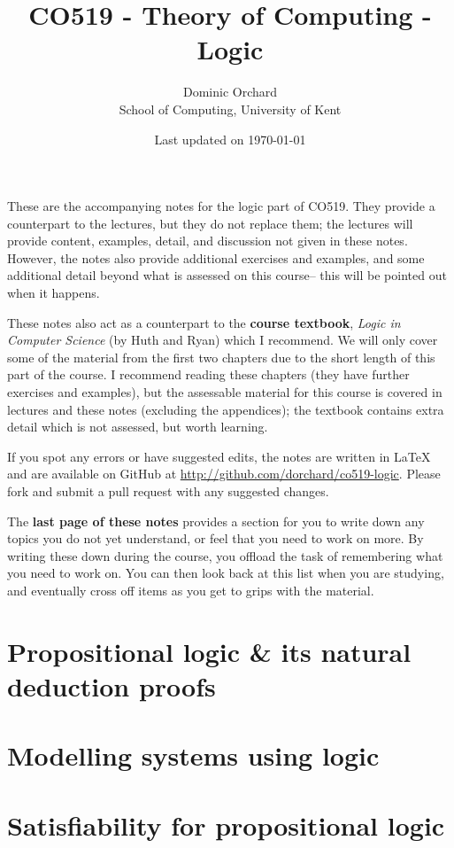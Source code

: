 \documentclass[a4paper]{article}
\title{\vspace{-3em}CO519 - Theory of Computing - Logic}
\author{Dominic Orchard \\
  {\small{School of Computing, University of Kent}}}
\date{Last updated on \today}
\theoremstyle{definition}
\begin{document}
\maketitle

\noindent
These are the accompanying notes for the logic part of CO519. They
provide a counterpart to the lectures, but they do not replace them; the
lectures will provide content, examples, detail, and discussion not given in
these notes.  However, the notes also provide additional exercises and
examples, and some additional detail beyond what is assessed on this
course-- this will be pointed out when it happens.

These notes also act as a counterpart to the \textbf{course textbook},
\emph{Logic in Computer Science} (by Huth and Ryan) which I
recommend. We will only cover some of the material from the first two
chapters due to the short length of this part of the course. I
recommend reading these chapters (they have further exercises and
examples), but the assessable material for this course is covered in
lectures and these notes (excluding the appendices); the textbook
contains extra detail which is not assessed, but worth learning.

If you spot any errors or have suggested edits, the notes are written
in LaTeX and are available on GitHub at
\url{http://github.com/dorchard/co519-logic}. Please fork and submit a
pull request with any suggested changes.

The \textbf{last page of these notes} provides a section for you to
write down any topics you do not yet understand, or feel that you need
to work on more. By writing these down during the course, you offload
the task of remembering what you need to work on. You can then look
back at this list when you are studying, and eventually cross off items
as you get to grips with the material.

\part{Propositional logic \& its natural deduction
      proofs}



\part{Modelling systems using logic}
\setcounter{section}{0}



\part{Satisfiability for propositional logic}
\setcounter{section}{0}
\end{document}
